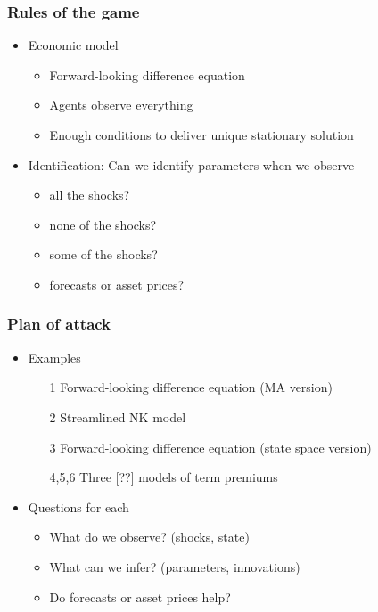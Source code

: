 \documentclass{beamer}
\begin{document}
\begin{frame}
\frametitle{Rules of the game}
\begin{itemize} \itemsep=\bigskipamount
\item Economic model \\
\begin{itemize}
\item Forward-looking difference equation  
\item Agents observe everything
\item Enough conditions to deliver unique stationary solution
\end{itemize}
\item Identification:  Can we identify parameters when we observe \\
\begin{itemize}
\item all the shocks?
\item none of the shocks?
\item some of the shocks?
\item forecasts or asset prices?
\end{itemize}
\end{itemize}
\end{frame}

\begin{frame}
\frametitle{Plan of attack}
\begin{itemize} \itemsep=\bigskipamount
\item Examples  \\
\begin{itemize}
\item [1] Forward-looking difference equation (MA version)
\item [2] Streamlined NK model
\item [3] Forward-looking difference equation (state space version)
\item [4,5,6] Three [??] models of term premiums
\end{itemize}
\item Questions for each  \\
\begin{itemize}
\item What do we observe?  (shocks, state)
\item What can we infer?  (parameters, innovations)
\item Do forecasts or asset prices help?
\end{itemize}
\end{itemize}
\end{frame}
\end{document}
